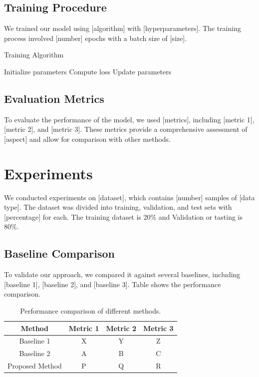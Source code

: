 \documentclass{article}
\begin{document}
\subsection{Training Procedure}
We trained our model using [algorithm] with [hyperparameters]. The training process involved [number] epochs with a batch size of [size].

\begin{algorithm}
\caption{Training Algorithm}
\begin{algorithmic}[1]
\State Initialize parameters
        \State Compute loss
        \State Update parameters
    \EndFor
\EndFor
\end{algorithmic}
\end{algorithm}

\subsection{Evaluation Metrics}
To evaluate the performance of the model, we used [metrics], including [metric 1], [metric 2], and [metric 3]. These metrics provide a comprehensive assessment of [aspect] and allow for comparison with other methods.

\section{Experiments}
We conducted experiments on [dataset], which contains [number] samples of [data type]. The dataset was divided into training, validation, and test sets with [percentage] for each. The training dataset is 20\% and Validation or tasting is 80\%. 

\subsection{Baseline Comparison}
To validate our approach, we compared it against several baselines, including [baseline 1], [baseline 2], and [baseline 3]. Table shows the performance comparison.

\begin{table}[h]
\centering
\begin{tabular}{|c|c|c|c|}
\hline
Method & Metric 1 & Metric 2 & Metric 3 \\
\hline
Baseline 1 & X & Y & Z \\
Baseline 2 & A & B & C \\
Proposed Method & P & Q & R \\
\hline
\end{tabular}
\caption{Performance comparison of different methods.}
\label{tab:results}
\end{table}
\end{document}
